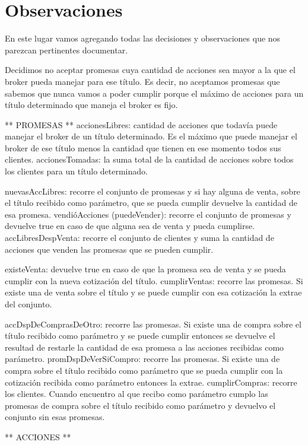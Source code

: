 \section{Observaciones}

En este lugar vamos agregando todas las decisiones y observaciones que nos parezcan pertinentes documentar.

Decidimos no aceptar promesas cuya cantidad de acciones sea mayor a la que el broker pueda manejar para ese título. Es decir, no aceptamos promesas que
sabemos que nunca vamos a poder cumplir porque el máximo de acciones para un título determinado que maneja el broker es fijo.

** PROMESAS ** 
accionesLibres: cantidad de acciones que todavía puede manejar el broker de un título determinado. Es el máximo que puede manejar el broker de ese título menos la cantidad que tienen en ese momento todos sus clientes.
accionesTomadas: la suma total de la cantidad de acciones sobre todos los clientes para un título determinado.

nuevasAccLibres: recorre el conjunto de promesas y si hay alguna de venta, sobre el título recibido como parámetro, que se pueda cumplir devuelve la 
		 cantidad de esa promesa.
vendióAcciones (puedeVender): recorre el conjunto de promesas y devuelve true en caso de que alguna sea de venta y pueda cumplirse.
accLibresDespVenta: recorre el conjunto de clientes y suma la cantidad de acciones que venden las promesas que se pueden cumplir.

existeVenta: devuelve true en caso de que la promesa sea de venta y se pueda cumplir con la nueva cotización del título.
cumplirVentas: recorre las promesas. Si existe una de venta sobre el título y se puede cumplir con esa cotización la extrae del conjunto.

accDspDeComprasDeOtro: recorre las promesas. Si existe una de compra sobre el título recibido como parámetro y se puede cumplir entonces se devuelve el
		       resultad de restarle la cantidad de esa promesa a las acciones recibidas como parámetro.
promDspDeVerSiCompro: recorre las promesas. Si existe una de compra sobre el título recibido como parámetro que se pueda cumplir con la cotización 
		       recibida como parámetro entonces la extrae.
cumplirCompras: recorre los clientes. Cuando encuentro al que recibo como parámetro cumplo las promesas de compra sobre el título recibido como parámetro 
		y devuelvo el conjunto sin esas promesas.
		

** ACCIONES **
